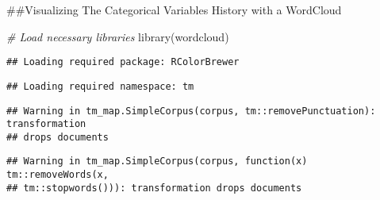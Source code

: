 \documentclass[
]{article}
\newenvironment{Shaded}{\begin{snugshade}}{\end{snugshade}}
\newcommand{\AttributeTok}[1]{\textcolor[rgb]{0.77,0.63,0.00}{#1}}
\newcommand{\CommentTok}[1]{\textcolor[rgb]{0.56,0.35,0.01}{\textit{#1}}}
\newcommand{\ConstantTok}[1]{\textcolor[rgb]{0.00,0.00,0.00}{#1}}
\newcommand{\DecValTok}[1]{\textcolor[rgb]{0.00,0.00,0.81}{#1}}
\newcommand{\FloatTok}[1]{\textcolor[rgb]{0.00,0.00,0.81}{#1}}
\newcommand{\FunctionTok}[1]{\textcolor[rgb]{0.00,0.00,0.00}{#1}}
\newcommand{\NormalTok}[1]{#1}
\newcommand{\OtherTok}[1]{\textcolor[rgb]{0.56,0.35,0.01}{#1}}
\newcommand{\SpecialCharTok}[1]{\textcolor[rgb]{0.00,0.00,0.00}{#1}}
\newcommand{\StringTok}[1]{\textcolor[rgb]{0.31,0.60,0.02}{#1}}
\begin{document}
\#\#Visualizing The Categorical Variables History with a WordCloud

\begin{Shaded}
\begin{Highlighting}[]
\CommentTok{\# Load necessary libraries}
\FunctionTok{library}\NormalTok{(wordcloud)}
\end{Highlighting}
\end{Shaded}

\begin{verbatim}
## Loading required package: RColorBrewer
\end{verbatim}

\begin{Shaded}
\end{Shaded}

\begin{verbatim}
## Loading required namespace: tm
\end{verbatim}

\begin{verbatim}
## Warning in tm_map.SimpleCorpus(corpus, tm::removePunctuation): transformation
## drops documents
\end{verbatim}

\begin{verbatim}
## Warning in tm_map.SimpleCorpus(corpus, function(x) tm::removeWords(x,
## tm::stopwords())): transformation drops documents
\end{verbatim}
\end{document}
